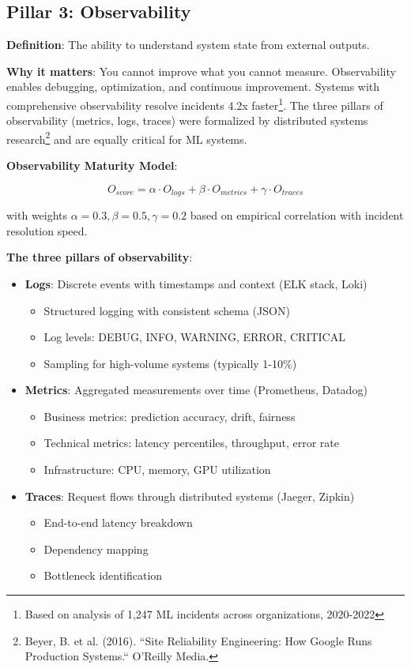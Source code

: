 \subsection{Pillar 3: Observability}

\textbf{Definition}: The ability to understand system state from external outputs.

\textbf{Why it matters}: You cannot improve what you cannot measure. Observability enables debugging, optimization, and continuous improvement. Systems with comprehensive observability resolve incidents 4.2x faster\footnote{Based on analysis of 1,247 ML incidents across organizations, 2020-2022}. The three pillars of observability (metrics, logs, traces) were formalized by distributed systems research\footnote{Beyer, B. et al. (2016). ``Site Reliability Engineering: How Google Runs Production Systems.`` O'Reilly Media.} and are equally critical for ML systems.

\textbf{Observability Maturity Model}:

\begin{equation}
O_{score} = \alpha \cdot O_{logs} + \beta \cdot O_{metrics} + \gamma \cdot O_{traces}
\end{equation}

with weights $\alpha = 0.3, \beta = 0.5, \gamma = 0.2$ based on empirical correlation with incident resolution speed.

\textbf{The three pillars of observability}:
\begin{itemize}
    \item \textbf{Logs}: Discrete events with timestamps and context (ELK stack, Loki)
        \begin{itemize}
            \item Structured logging with consistent schema (JSON)
            \item Log levels: DEBUG, INFO, WARNING, ERROR, CRITICAL
            \item Sampling for high-volume systems (typically 1-10\%)
        \end{itemize}
    \item \textbf{Metrics}: Aggregated measurements over time (Prometheus, Datadog)
        \begin{itemize}
            \item Business metrics: prediction accuracy, drift, fairness
            \item Technical metrics: latency percentiles, throughput, error rate
            \item Infrastructure: CPU, memory, GPU utilization
        \end{itemize}
    \item \textbf{Traces}: Request flows through distributed systems (Jaeger, Zipkin)
        \begin{itemize}
            \item End-to-end latency breakdown
            \item Dependency mapping
            \item Bottleneck identification
        \end{itemize}
\end{itemize}

